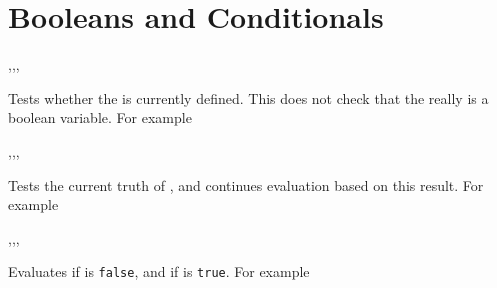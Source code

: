 \documentclass[oneside]{book}
\begin{document}
\section{Booleans and Conditionals}

\begin{function}{\BoolIfExist,\BoolIfExistT,\BoolIfExistF,\BoolIfExistTF}
\begin{syntax}
 
  
  
   
\end{syntax}
Tests whether the  is currently defined.  This does not
check that the  really is a boolean variable.
For example
\begin{demohigh}
\BoolIfExistTF {} {}
\BoolIfExistTF {} {}
\end{demohigh}
\end{function}

\begin{function}{\BoolVarIf,\BoolVarIfT,\BoolVarIfF,\BoolVarIfTF}
\begin{syntax}
 
  
  
   
\end{syntax}
Tests the current truth of , and continues evaluation
based on this result. For example
\begin{demohigh}
\BoolSetTrue \lTmpaBool
\BoolVarIfTF {} {}
\BoolSetFalse \lTmpaBool
\BoolVarIfTF {} {}
\end{demohigh}
\end{function}

\begin{function}{\BoolVarNot,\BoolVarNotT,\BoolVarNotF,\BoolVarNotTF}
\begin{syntax}
 
  
  
   
\end{syntax}
Evaluates  if  is \verb!false!,
and  if  is \verb!true!.
For example
\begin{demohigh}
 {} {}
\end{demohigh}
\end{function}
\end{document}
